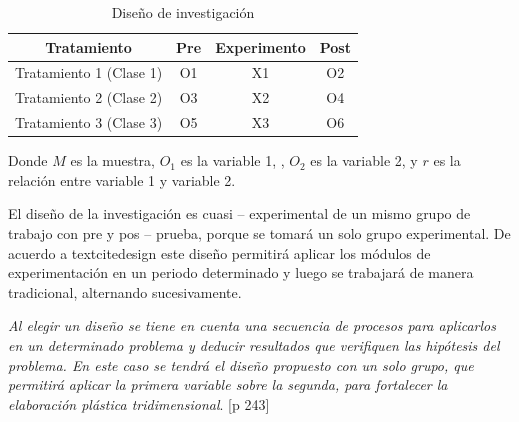 \documentclass[12pt,a4paper]{article}
\begin{document}
\begin{table}[ht!]
	\caption{Diseño de investigación}
	\label{figg}

	\begin{tabular}{cccc}
		\toprule
		Tratamiento             & Pre & Experimento & Post \\
		\midrule
		Tratamiento 1 (Clase 1) & O1  & X1          & O2   \\
		Tratamiento 2 (Clase 2) & O3  & X2          & O4   \\
		Tratamiento 3 (Clase 3) & O5  & X3          & O6   \\
		\bottomrule
	\end{tabular}
\end{table}


Donde $M$ es la muestra, $O_1$ es la variable 1, \MakeTextLowercase{\variablei},
$O_2$ es la variable 2, \MakeTextLowercase{\variabled} y
$r$ es la relación entre variable 1 y variable 2.

El diseño de la investigación es cuasi -- experimental de un mismo grupo de trabajo con pre y pos -- prueba, porque se tomará un solo grupo experimental. De acuerdo a textcite{design} este diseño permitirá aplicar los módulos de experimentación en un periodo determinado y luego se trabajará de manera tradicional, alternando sucesivamente.

\begin{displayquote}
	\emph{Al elegir un diseño se tiene en cuenta una secuencia de procesos para aplicarlos en un determinado problema y deducir resultados que verifiquen las hipótesis del problema. En este caso se tendrá el diseño propuesto con un solo grupo, que permitirá aplicar la primera variable sobre la segunda, para fortalecer la elaboración plástica tridimensional}. \cite{kothari_research_2004}[p 243]
\end{displayquote}
\end{document}
